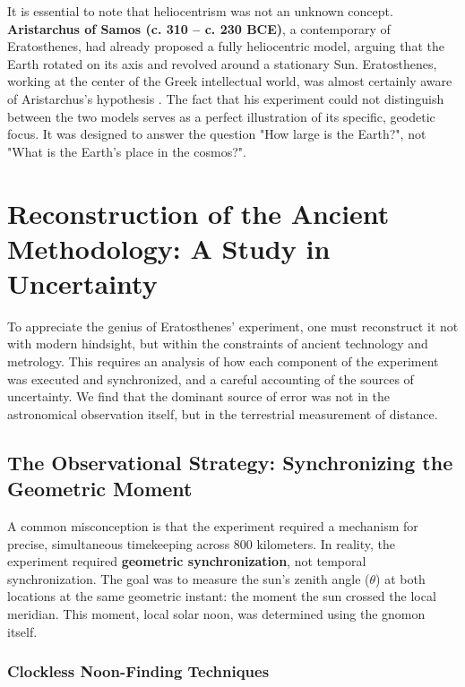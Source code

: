 \documentclass[11pt]{article}
\begin{document}
It is essential to note that heliocentrism was not an unknown concept. \textbf{Aristarchus of Samos (c. 310 – c. 230 BCE)}, a contemporary of Eratosthenes, had already proposed a fully heliocentric model, arguing that the Earth rotated on its axis and revolved around a stationary Sun. Eratosthenes, working at the center of the Greek intellectual world, was almost certainly aware of Aristarchus's hypothesis \cite{Heath1913}. The fact that his experiment could not distinguish between the two models serves as a perfect illustration of its specific, geodetic focus. It was designed to answer the question "How large is the Earth?", not "What is the Earth's place in the cosmos?".



\section{Reconstruction of the Ancient Methodology: A Study in Uncertainty}

To appreciate the genius of Eratosthenes' experiment, one must reconstruct it not with modern hindsight, but within the constraints of ancient technology and metrology. This requires an analysis of how each component of the experiment was executed and synchronized, and a careful accounting of the sources of uncertainty. We find that the dominant source of error was not in the astronomical observation itself, but in the terrestrial measurement of distance.

\subsection{The Observational Strategy: Synchronizing the Geometric Moment}

A common misconception is that the experiment required a mechanism for precise, simultaneous timekeeping across 800 kilometers. In reality, the experiment required \textbf{geometric synchronization}, not temporal synchronization. The goal was to measure the sun's zenith angle ($\theta$) at both locations at the same geometric instant: the moment the sun crossed the local meridian. This moment, local solar noon, was determined using the gnomon itself.

\subsubsection{Clockless Noon-Finding Techniques}
\end{document}
